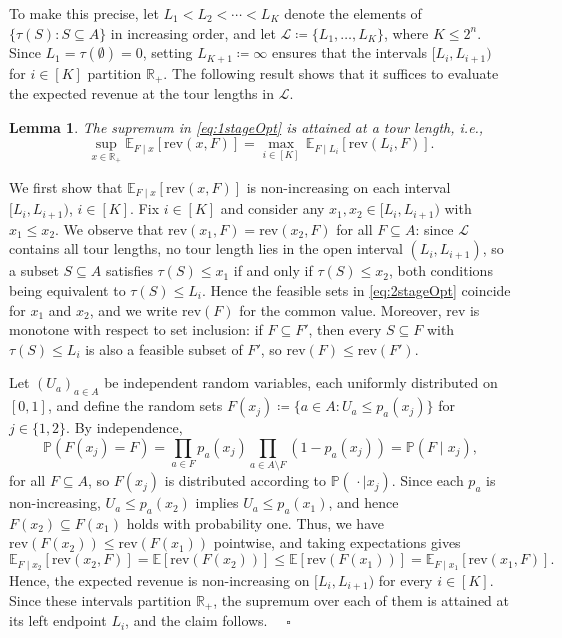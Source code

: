\documentclass[11pt]{article}
\theoremstyle{plain}
\newtheorem{lemma}[theorem]{Lemma}
\theoremstyle{definition}
\renewenvironment{proof}[1]{\par\noindent{\itshape #1}\space\ignorespaces}{\par\medskip}
\newcommand{\Halmos}{\ensuremath{\quad\square}}
\begin{document}
	To make this precise, let $L_1 < L_2 < \cdots < L_K$ denote the elements of $\{\tau(S) \colon S \subseteq A\}$ in increasing order, and let $\mathcal{L} \coloneqq \{L_1, \ldots, L_K\}$, where $K \leq 2^n$. Since $L_1 = \tau(\emptyset) = 0$, setting $L_{K+1} \coloneqq \infty$ ensures that the intervals $[L_i, L_{i+1})$ for $i \in [K]$ partition $\mathbb{R}_+$. The following result shows that it suffices to evaluate the expected revenue at the tour lengths in $\mathcal{L}$.

	\begin{lemma} \label{lemma:discretisation_length}
		The supremum in \eqref{eq:1stageOpt} is attained at a tour length, i.e.,
		\[
			\sup_{x \in \mathbb{R}_+} \mathbb{E}_{F\mid x}\left[ \text{rev}(x, F) \right] = \max_{i \in [K]} \, \mathbb{E}_{F\mid L_i}\left[ \text{rev}(L_i, F) \right].
		\]
	\end{lemma}
	\begin{proof}{Proof.}
		We first show that $\mathbb{E}_{F\mid x}\left[ \text{rev}(x, F) \right]$ is non-increasing on each interval $[L_i, L_{i+1})$, $i \in [K]$. Fix $i \in [K]$ and consider any $x_1, x_2 \in [L_i, L_{i+1})$ with $x_1 \leq x_2$. We observe that $\text{rev}(x_1, F) = \text{rev}(x_2, F)$ for all $F \subseteq A$: since $\mathcal{L}$ contains all tour lengths, no tour length lies in the open interval $(L_i, L_{i+1})$, so a subset $S \subseteq A$ satisfies $\tau(S) \leq x_1$ if and only if $\tau(S) \leq x_2$, both conditions being equivalent to $\tau(S) \leq L_i$. Hence the feasible sets in \eqref{eq:2stageOpt} coincide for $x_1$ and $x_2$, and we write $\text{rev}(F)$ for the common value. Moreover, $\text{rev}$ is monotone with respect to set inclusion: if $F \subseteq F'$, then every $S \subseteq F$ with $\tau(S) \leq L_i$ is also a feasible subset of $F'$, so $\text{rev}(F) \leq \text{rev}(F')$.

		Let $(U_a)_{a \in A}$ be independent random variables, each uniformly distributed on $[0,1]$, and define the random sets $F(x_j) \coloneqq \{a \in A \colon U_a \leq p_a(x_j)\}$ for $j \in \{1,2\}$. By independence,
		\begin{equation}\label{eq:help1}
			\mathbb{P}\left(F(x_j) = F\right) = \prod_{a \in F} p_a(x_j) \prod_{a \in A \setminus F} (1 - p_a(x_j)) = \mathbb{P}(F \mid x_j),
		\end{equation}
		for all \(F \subseteq A\),
		so $F(x_j)$ is distributed according to $\mathbb{P}(\,\cdot \mid x_j)$. Since each $p_a$ is non-increasing, $U_a \leq p_a(x_2)$ implies $U_a \leq p_a(x_1)$, and hence $F(x_2) \subseteq F(x_1)$ holds with probability one. Thus, we have $\text{rev}(F(x_2)) \leq \text{rev}(F(x_1))$ pointwise, and taking expectations gives
		\[
			\mathbb{E}_{F\mid x_2}\left[ \text{rev}(x_2, F) \right] = \mathbb{E}\left[ \text{rev}(F(x_2)) \right] \leq \mathbb{E}\left[ \text{rev}(F(x_1)) \right] = \mathbb{E}_{F\mid x_1}\left[ \text{rev}(x_1, F) \right].
		\]
		Hence, the expected revenue is non-increasing on $[L_i, L_{i+1})$ for every $i \in [K]$. Since these intervals partition $\mathbb{R}_+$, the supremum over each of them is attained at its left endpoint $L_i$, and the claim follows.
	\Halmos
\end{proof}
\end{document}
